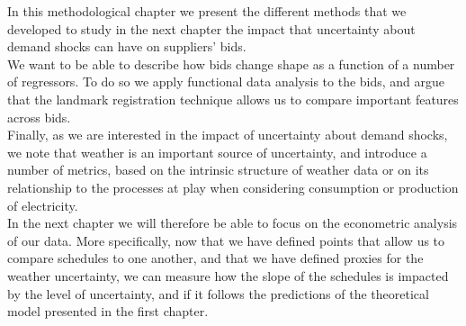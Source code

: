 In this methodological chapter we present the different methods that we developed to study in the next chapter the impact that uncertainty about demand shocks can have on suppliers' bids. \\

We want to be able to describe how bids change shape as a function of a number of regressors. To do so we apply functional data analysis to the bids, and argue that the landmark registration technique allows us to compare important features across bids. \\

Finally, as we are interested in the impact of uncertainty about demand shocks, we note that weather is an important source of uncertainty, and introduce a number of metrics, based on the intrinsic structure of weather data or on its relationship to the processes at play when considering consumption or production of electricity. \\

In the next chapter we will therefore be able to focus on the econometric analysis of our data. More specifically, now that we have defined points that allow us to compare schedules to one another, and that we have defined proxies for the weather uncertainty, we can measure how the slope of the schedules is impacted by the level of uncertainty, and if it follows the predictions of the theoretical model presented in the first chapter.

